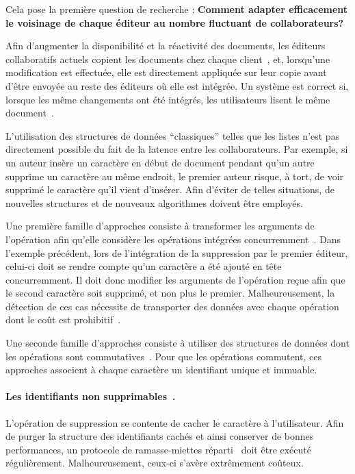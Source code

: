 Cela pose la première question de recherche : \textbf{Comment adapter
  efficacement le voisinage de chaque éditeur au nombre fluctuant de
  collaborateurs?}


Afin d'augmenter la disponibilité et la réactivité des documents, les éditeurs
collaboratifs actuels copient les documents chez chaque
client~\cite{saito2005optimistic}, et, lorsqu'une modification est effectuée,
elle est directement appliquée sur leur copie avant d'être envoyée au reste des
éditeurs où elle est intégrée. Un système est correct si, lorsque les même
changements ont été intégrés, les utilisateurs lisent le même
document~\cite{burckhardt2014replicated, shapiro2011conflict}.

L'utilisation des structures de données ``classiques'' telles que les listes
n'est pas directement possible du fait de la latence entre les
collaborateurs. Par exemple, si un auteur insère un caractère en début de
document pendant qu'un autre supprime un caractère au même endroit, le premier
auteur risque, à tort, de voir supprimé le caractère qu'il vient d'insérer. Afin
d'éviter de telles situations, de nouvelles structures et de nouveaux
algorithmes doivent être employés.

Une première famille d'approches consiste à transformer les arguments de
l'opération afin qu'elle considère les opérations intégrées
concurremment~\cite{sun1998operational}. Dans l'exemple précédent, lors de
l'intégration de la suppression par le premier éditeur, celui-ci doit se rendre
compte qu'un caractère a été ajouté en tête concurremment. Il doit donc modifier
les arguments de l'opération reçue afin que le second caractère soit supprimé,
et non plus le premier. Malheureusement, la détection de ces cas nécessite de
transporter des données avec chaque opération dont le coût est
prohibitif~\cite{sun2009contextbased}.

Une seconde famille d'approches consiste à utiliser des structures de données
dont les opérations sont commutatives~\cite{shapiro2011conflict}. Pour que les
opérations commutent, ces approches associent à chaque caractère un identifiant
unique et immuable.

\paragraph{Les identifiants non supprimables~\cite{oster2006data}.} L'opération
de suppression se contente de cacher le caractère à l'utilisateur. Afin de
purger la structure des identifiants cachés et ainsi conserver de bonnes
performances, un protocole de ramasse-miettes
réparti~\cite{abdullahi1998garbage} doit être exécuté
régulièrement. Malheureusement, ceux-ci s'avère extrêmement coûteux.

